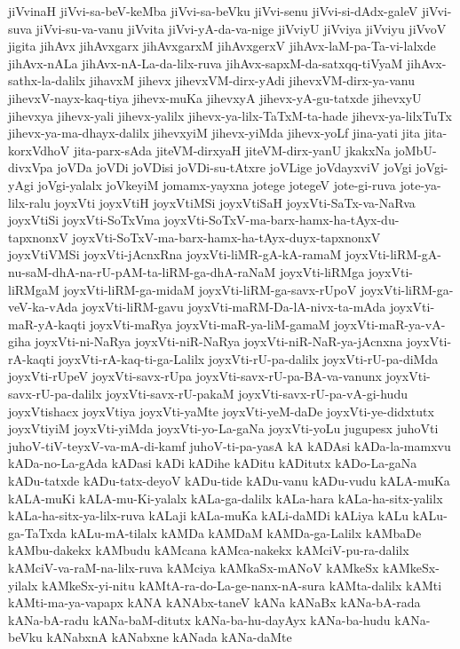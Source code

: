 {jiVvinaH
jiVvi-sa-beV-keMba
jiVvi-sa-beVku
jiVvi-senu
jiVvi-si-dAdx-galeV
jiVvi-suva
jiVvi-su-va-vanu
jiVvita
jiVvi-yA-da-va-nige
jiVviyU
jiVviya
jiVviyu
jiVvoV
jigita
jihAvx
jihAvxgarx
jihAvxgarxM
jihAvxgerxV
jihAvx-laM-pa-Ta-vi-lalxde
jihAvx-nALa
jihAvx-nA-La-da-lilx-ruva
jihAvx-sapxM-da-satxqq-tiVyaM
jihAvx-sathx-la-dalilx
jihavxM
jihevx
jihevxVM-dirx-yAdi
jihevxVM-dirx-ya-vanu
jihevxV-nayx-kaq-tiya
jihevx-muKa
jihevxyA
jihevx-yA-gu-tatxde
jihevxyU
jihevxya
jihevx-yali
jihevx-yalilx
jihevx-ya-lilx-TaTxM-ta-hade
jihevx-ya-lilxTuTx
jihevx-ya-ma-dhayx-dalilx
jihevxyiM
jihevx-yiMda
jihevx-yoLf
jina-yati
jita
jita-korxVdhoV
jita-parx-sAda
jiteVM-dirxyaH
jiteVM-dirx-yanU
jkakxNa
joMbU-divxVpa
joVDa
joVDi
joVDisi
joVDi-su-tAtxre
joVLige
joVdayxviV
joVgi
joVgi-yAgi
joVgi-yalalx
joVkeyiM
jomamx-yayxna
jotege
jotegeV
jote-gi-ruva
jote-ya-lilx-ralu
joyxVti
joyxVtiH
joyxVtiMSi
joyxVtiSaH
joyxVti-SaTx-va-NaRva
joyxVtiSi
joyxVti-SoTxVma
joyxVti-SoTxV-ma-barx-hamx-ha-tAyx-du-tapxnonxV
joyxVti-SoTxV-ma-barx-hamx-ha-tAyx-duyx-tapxnonxV
joyxVtiVMSi
joyxVti-jAcnxRna
joyxVti-liMR-gA-kA-ramaM
joyxVti-liRM-gA-nu-saM-dhA-na-rU-pAM-ta-liRM-ga-dhA-raNaM
joyxVti-liRMga
joyxVti-liRMgaM
joyxVti-liRM-ga-midaM
joyxVti-liRM-ga-savx-rUpoV
joyxVti-liRM-ga-veV-ka-vAda
joyxVti-liRM-gavu
joyxVti-maRM-Da-lA-nivx-ta-mAda
joyxVti-maR-yA-kaqti
joyxVti-maRya
joyxVti-maR-ya-liM-gamaM
joyxVti-maR-ya-vA-giha
joyxVti-ni-NaRya
joyxVti-niR-NaRya
joyxVti-niR-NaR-ya-jAcnxna
joyxVti-rA-kaqti
joyxVti-rA-kaq-ti-ga-Lalilx
joyxVti-rU-pa-dalilx
joyxVti-rU-pa-diMda
joyxVti-rUpeV
joyxVti-savx-rUpa
joyxVti-savx-rU-pa-BA-va-vanunx
joyxVti-savx-rU-pa-dalilx
joyxVti-savx-rU-pakaM
joyxVti-savx-rU-pa-vA-gi-hudu
joyxVtishacx
joyxVtiya
joyxVti-yaMte
joyxVti-yeM-daDe
joyxVti-ye-didxtutx
joyxVtiyiM
joyxVti-yiMda
joyxVti-yo-La-gaNa
joyxVti-yoLu
jugupesx
juhoVti
juhoV-tiV-teyxV-va-mA-di-kamf
juhoV-ti-pa-yasA
kA
kADAsi
kADa-la-mamxvu
kADa-no-La-gAda
kADasi
kADi
kADihe
kADitu
kADitutx
kADo-La-gaNa
kADu-tatxde
kADu-tatx-deyoV
kADu-tide
kADu-vanu
kADu-vudu
kALA-muKa
kALA-muKi
kALA-mu-Ki-yalalx
kALa-ga-dalilx
kALa-hara
kALa-ha-sitx-yalilx
kALa-ha-sitx-ya-lilx-ruva
kALaji
kALa-muKa
kALi-daMDi
kALiya
kALu
kALu-ga-TaTxda
kALu-mA-tilalx
kAMDa
kAMDaM
kAMDa-ga-Lalilx
kAMbaDe
kAMbu-dakekx
kAMbudu
kAMcana
kAMca-nakekx
kAMciV-pu-ra-dalilx
kAMciV-va-raM-na-lilx-ruva
kAMciya
kAMkaSx-mANoV
kAMkeSx
kAMkeSx-yilalx
kAMkeSx-yi-nitu
kAMtA-ra-do-La-ge-nanx-nA-sura
kAMta-dalilx
kAMti
kAMti-ma-ya-vapapx
kANA
kANAbx-taneV
kANa
kANaBx
kANa-bA-rada
kANa-bA-radu
kANa-baM-ditutx
kANa-ba-hu-dayAyx
kANa-ba-hudu
kANa-beVku
kANabxnA
kANabxne
kANada
kANa-daMte
}
